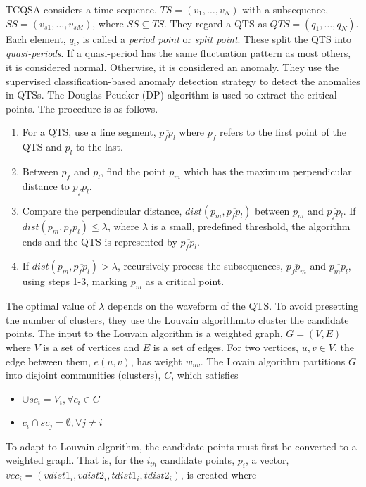 \documentclass[twoside,twocolumn]{article}
\begin{document}
TCQSA considers a time sequence, $TS=(v_1, \dots, v_N)$ with a subsequence, $SS=(v_{s1},\dots,v_{sM})$, where $SS\subseteq TS$.  They regard a QTS as $QTS=(q_1,\dots, q_N)$.  Each element, $q_i$, is called a {\em period point} or {\em split point}.  These split the QTS into {\em quasi-periods}.  If a quasi-period has the same fluctuation pattern as most others, it is considered normal.  Otherwise, it is considered an anomaly.  They use the supervised classiﬁcation-based anomaly detection strategy to detect the anomalies in QTSs.  The Douglas-Peucker (DP) algorithm is used to extract the critical points.  The procedure is as follows.
\begin{enumerate}
	\item For a QTS, use a line segment, $\overline{p_fp_l}$ where $p_f$ refers to the first point of the QTS and $p_l$ to the last.
	\item Between $p_f$ and $p_l$, find the point $p_m$ which has the maximum perpendicular distance to $\overline{p_fp_l}$.
	\item Compare the perpendicular distance, $dist(p_m,\overline{p_fp_l})$ between $p_m$ and $\overline{p_fp_l}$.  If $dist(p_m,\overline{p_fp_l})\leq\lambda$, where $\lambda$ is a small, predefined threshold, the algorithm ends and the QTS is represented by $\overline{p_fp_l}$.
	\item If $dist(p_m,\overline{p_fp_l})>\lambda$, recursively process the subsequences,  $\overline{p_fp_m}$ and $\overline{p_mp_l}$, using steps 1-3, marking $p_m$ as a critical point.
\end{enumerate}
The optimal value of $\lambda$ depends on the waveform of the QTS.  To avoid presetting the number of clusters, they use the Louvain algorithm.to cluster the candidate points.  The input to the Louvain algorithm is a weighted graph, $G=(V,E)$ where $V$ is a set of vertices and $E$ is a set of edges.  For two vertices, $u,v\in V$, the edge between them, $e(u,v)$, has weight $w_{uv}$.  The Lovain algorithm partitions $G$ into disjoint communities (clusters), $C$, which satisfies
\begin{itemize}
	\item $\cup sc_i=V_i, \forall c_i\in C$
	\item $c_i \cap sc_j = \emptyset, \forall j \neq i$
\end{itemize}
To adapt to Louvain algorithm, the candidate points must first be converted to a weighted graph.  That is, for the $i_{th}$ candidate points, $p_i$, a vector, $vec_i=(vdist1_i,vdist2_i,tdist1_i,tdist2_i)$, is created where 
\end{document}
